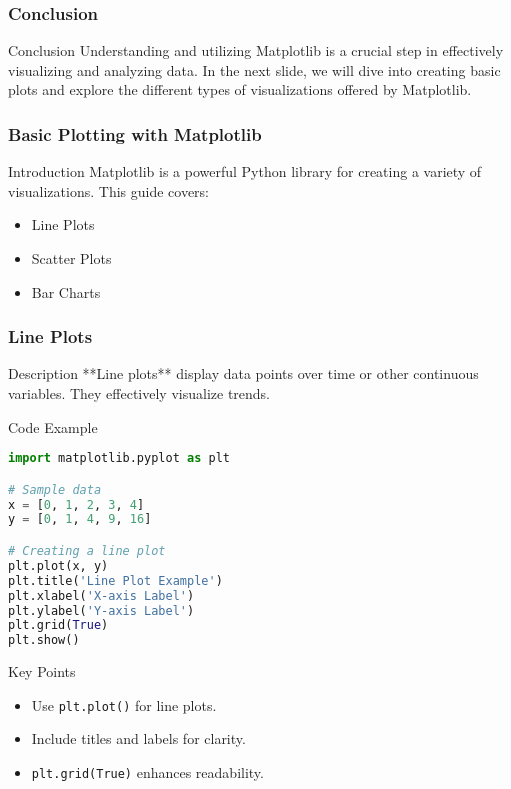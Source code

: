 \documentclass[aspectratio=169]{beamer}
\begin{document}
\begin{frame}[fragile]
    \frametitle{Conclusion}
    \begin{block}{Conclusion}
        Understanding and utilizing Matplotlib is a crucial step in effectively visualizing and analyzing data. 
        In the next slide, we will dive into creating basic plots and explore the different types of visualizations offered by Matplotlib.
    \end{block}
\end{frame}

\begin{frame}
    \frametitle{Basic Plotting with Matplotlib}
    \begin{block}{Introduction}
        Matplotlib is a powerful Python library for creating a variety of visualizations. This guide covers:
        \begin{itemize}
            \item Line Plots
            \item Scatter Plots
            \item Bar Charts
        \end{itemize}
    \end{block}
\end{frame}

\begin{frame}[fragile]
    \frametitle{Line Plots}
    \begin{block}{Description}
        **Line plots** display data points over time or other continuous variables. They effectively visualize trends.
    \end{block}
    
    \begin{block}{Code Example}
    \begin{lstlisting}[language=Python]
import matplotlib.pyplot as plt

# Sample data
x = [0, 1, 2, 3, 4]
y = [0, 1, 4, 9, 16]

# Creating a line plot
plt.plot(x, y)
plt.title('Line Plot Example')
plt.xlabel('X-axis Label')
plt.ylabel('Y-axis Label')
plt.grid(True)
plt.show()
    \end{lstlisting}
    \end{block}

    \begin{block}{Key Points}
        \begin{itemize}
            \item Use \texttt{plt.plot()} for line plots.
            \item Include titles and labels for clarity.
            \item \texttt{plt.grid(True)} enhances readability.
        \end{itemize}
    \end{block}
\end{frame}
\end{document}
